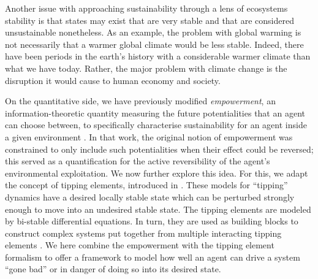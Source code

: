 \documentclass[conference]{IEEEtran}
\begin{document}
Another issue with approaching sustainability through a lens of
ecosystems stability is that states may exist that are very stable and
that are considered unsustainable nonetheless. As an example, the
problem with global warming is not necessarily that a warmer global
climate would be less stable. Indeed, there have been periods in the
earth's history with a considerable warmer climate than what we have
today. Rather, the major problem with climate change is the disruption
it would cause to human economy and society.





On the quantitative side, we have previously modified
\emph{empowerment}, an information-theoretic quantity measuring the
future potentialities that an agent can choose between, to
specifically characterise sustainability for an agent inside a given
environment \cite{Kim2009_sustainability}. In that work, the original
notion of empowerment was constrained to only include such
potentialities when their effect could be reversed; this served as a
quantification for the active reversibility of the agent's
environmental exploitation. We now further explore this idea. For
this, we adapt the concept of tipping elements, introduced in
\cite{Lenton2008_tippingelements}. These models for ``tipping''
dynamics have a desired locally stable state which can be perturbed
strongly enough to move into an undesired stable state. The tipping
elements are modeled by bi-stable differential equations. In turn,
they are used as building blocks to construct complex systems put
together from multiple interacting tipping elements
\cite{Brummitt2015_coupledcatastrophes,Klose2019_interactingtippingelements}.
We here combine the empowerment with the tipping element formalism to
offer a framework to model how well an agent can drive a system ``gone
bad'' or in danger of doing so into its desired state.

\end{document}
